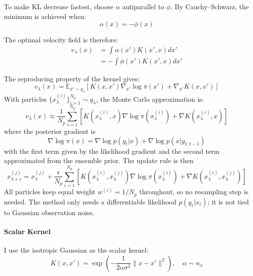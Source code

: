 \documentclass{article}
\begin{document}
To make KL decrease fastest, choose $\alpha$ antiparallel to $\phi$. By Cauchy--Schwarz, the minimum is achieved when:
\begin{equation}
\alpha(x) = -\phi(x)
\end{equation}

The optimal velocity field is therefore:
\begin{align}
v_\lambda(x) &= \int \alpha(x') K(x', x) dx' \\
&= -\int \phi(x') K(x', x) dx'
\end{align}

The reproducing property of the kernel gives:
\begin{equation}
\boxed{v_\lambda(x) = \mathbb{E}_{x' \sim q_\lambda}\left[K(x,x')\nabla_{x'} \log \pi(x') + \nabla_{x'} K(x,x')\right]}
\end{equation}
With particles $\{x_\lambda^{(i)}\}_{i=1}^{N_p} \sim q_\lambda$, the Monte Carlo approximation is:
\begin{equation}
v_\lambda(x) \approx \frac{1}{N_p} \sum_{i=1}^{N_p} \left[K(x^{(i)}_\lambda, x)\nabla \log \pi(x^{(i)}_\lambda) + \nabla K(x^{(i)}_\lambda, x)\right]
\end{equation}
where the posterior gradient is
\begin{equation}
\nabla \log \pi(x) = \nabla \log p(y_t | x) + \nabla \log p(x | y_{1:t-1})
\end{equation}
with the first term given by the likelihood gradient and the second term approximated from the ensemble prior. The update rule is then
\begin{equation}
x_{\lambda+\epsilon}^{(j)} = x_\lambda^{(j)} + \frac{\epsilon}{N_p} \sum_{i=1}^{N_p} \left[K(x^{(i)}_\lambda, x^{(j)}_\lambda)\nabla \log \pi(x^{(i)}_\lambda) + \nabla K(x^{(i)}_\lambda, x^{(j)}_\lambda)\right]
\end{equation}
All particles keep equal weight $w^{(i)} = 1/N_p$ throughout, so no resampling step is needed. The method only needs a differentiable likelihood $p(y_t | x_t)$; it is not tied to Gaussian observation noise.
\paragraph{Scalar Kernel}

I use the isotropic Gaussian as the scalar kernel:
\begin{equation}
K(x,x') = \exp\left(-\frac{1}{2\alpha\sigma^2}\|x-x'\|^2\right), \quad \alpha \sim n_x
\end{equation}
\end{document}
